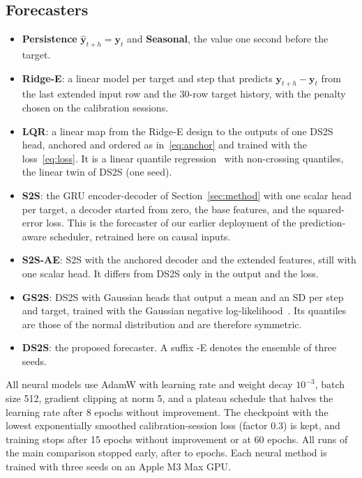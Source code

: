 \subsection{Forecasters}
\begin{itemize}
  \item \textbf{Persistence} $\hat{\mathbf{y}}_{t+h}=\mathbf{y}_t$ and \textbf{Seasonal}, the value one second before the target.
  \item \textbf{Ridge-E}: a linear model per target and step that predicts $\mathbf{y}_{t+h}-\mathbf{y}_t$ from the last extended input row and the 30-row target history, with the penalty chosen on the calibration sessions.
  \item \textbf{LQR}: a linear map from the Ridge-E design to the outputs of one DS2S head, anchored and ordered as in~\eqref{eq:anchor} and trained with the loss~\eqref{eq:loss}. It is a linear quantile regression~\cite{koenker1978regression} with non-crossing quantiles, the linear twin of DS2S (one seed).
  \item \textbf{S2S}: the GRU encoder-decoder of Section~\ref{sec:method} with one scalar head per target, a decoder started from zero, the base features, and the squared-error loss. This is the forecaster of our earlier deployment of the prediction-aware scheduler, retrained here on causal inputs.
  \item \textbf{S2S-AE}: S2S with the anchored decoder and the extended features, still with one scalar head. It differs from DS2S only in the output and the loss.
  \item \textbf{GS2S}: DS2S with Gaussian heads that output a mean and an SD per step and target, trained with the Gaussian negative log-likelihood~\cite{nix1994estimating}. Its quantiles are those of the normal distribution and are therefore symmetric.
  \item \textbf{DS2S}: the proposed forecaster. A suffix -E denotes the ensemble of three seeds.
\end{itemize}
All neural models use AdamW with learning rate and weight decay $10^{-3}$, batch size 512, gradient clipping at norm 5, and a plateau schedule that halves the learning rate after 8 epochs without improvement. The checkpoint with the lowest exponentially smoothed calibration-session loss (factor 0.3) is kept, and training stops after 15 epochs without improvement or at 60 epochs. All \NRuns{} runs of the main comparison stopped early, after \EpochsMin{} to \EpochsMax{} epochs. Each neural method is trained with three seeds on an Apple M3 Max GPU.


